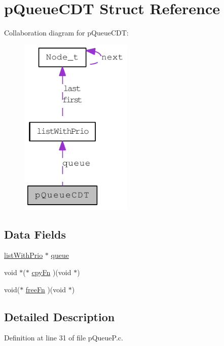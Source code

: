 \hypertarget{structp_queue_c_d_t}{
\section{pQueueCDT Struct Reference}
\label{structp_queue_c_d_t}
}


Collaboration diagram for pQueueCDT:\nopagebreak
\begin{figure}[H]
\begin{center}
\leavevmode
\includegraphics[width=152pt]{structp_queue_c_d_t__coll__graph}
\end{center}
\end{figure}
\subsection*{Data Fields}
\begin{DoxyCompactItemize}
\item 
\hyperlink{structlist_with_prio}{listWithPrio} $\ast$ \hyperlink{structp_queue_c_d_t_abd678f8ea5d396a97fd1938b4df23841}{queue}
\item 
void $\ast$($\ast$ \hyperlink{structp_queue_c_d_t_abce72dff83b4c0563783ac39950547ac}{cpyFn} )(void $\ast$)
\item 
void($\ast$ \hyperlink{structp_queue_c_d_t_a1ea7dba004336f82292919dfead1aceb}{freeFn} )(void $\ast$)
\end{DoxyCompactItemize}


\subsection{Detailed Description}


Definition at line 31 of file pQueueP.c.



